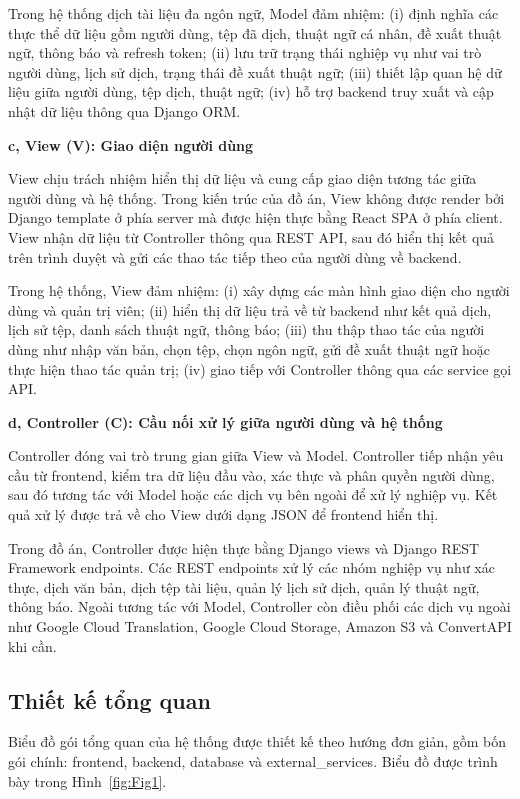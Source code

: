 ﻿\documentclass[../DoAn.tex]{subfiles}
\begin{document}
Trong hệ thống dịch tài liệu đa ngôn ngữ, Model đảm nhiệm: (i) định nghĩa các thực thể dữ liệu gồm người dùng, tệp đã dịch, thuật ngữ cá nhân, đề xuất thuật ngữ, thông báo và refresh token; (ii) lưu trữ trạng thái nghiệp vụ như vai trò người dùng, lịch sử dịch, trạng thái đề xuất thuật ngữ; (iii) thiết lập quan hệ dữ liệu giữa người dùng, tệp dịch, thuật ngữ; (iv) hỗ trợ backend truy xuất và cập nhật dữ liệu thông qua Django ORM.

\textbf{c, View (V): Giao diện người dùng}

View chịu trách nhiệm hiển thị dữ liệu và cung cấp giao diện tương tác giữa người dùng và hệ thống. Trong kiến trúc của đồ án, View không được render bởi Django template ở phía server mà được hiện thực bằng React SPA ở phía client. View nhận dữ liệu từ Controller thông qua REST API, sau đó hiển thị kết quả trên trình duyệt và gửi các thao tác tiếp theo của người dùng về backend.

Trong hệ thống, View đảm nhiệm: (i) xây dựng các màn hình giao diện cho người dùng và quản trị viên; (ii) hiển thị dữ liệu trả về từ backend như kết quả dịch, lịch sử tệp, danh sách thuật ngữ, thông báo; (iii) thu thập thao tác của người dùng như nhập văn bản, chọn tệp, chọn ngôn ngữ, gửi đề xuất thuật ngữ hoặc thực hiện thao tác quản trị; (iv) giao tiếp với Controller thông qua các service gọi API.

\textbf{d, Controller (C): Cầu nối xử lý giữa người dùng và hệ thống}

Controller đóng vai trò trung gian giữa View và Model. Controller tiếp nhận yêu cầu từ frontend, kiểm tra dữ liệu đầu vào, xác thực và phân quyền người dùng, sau đó tương tác với Model hoặc các dịch vụ bên ngoài để xử lý nghiệp vụ. Kết quả xử lý được trả về cho View dưới dạng JSON để frontend hiển thị.

Trong đồ án, Controller được hiện thực bằng Django views và Django REST Framework endpoints. Các REST endpoints xử lý các nhóm nghiệp vụ như xác thực, dịch văn bản, dịch tệp tài liệu, quản lý lịch sử dịch, quản lý thuật ngữ, thông báo. Ngoài tương tác với Model, Controller còn điều phối các dịch vụ ngoài như Google Cloud Translation, Google Cloud Storage, Amazon S3 và ConvertAPI khi cần.

\subsection{Thiết kế tổng quan}
Biểu đồ gói tổng quan của hệ thống được thiết kế theo hướng đơn giản, gồm bốn gói chính: frontend, backend, database và external\_services. Biểu đồ được trình bày trong Hình~\ref{fig:Fig1}.
\end{document}
